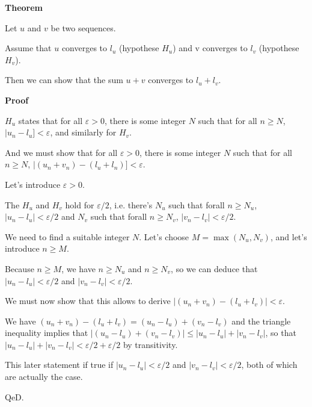 \documentclass{article}
\begin{document}
\textbf{Theorem}

Let $u$ and $v$ be two sequences.

Assume that $u$ converges to $l_u$ (hypothese $H_u$) and v converges to $l_v$ (hypothese $H_v$).

Then we can show that the sum $u+v$ converges to $l_u + l_v$.

\textbf{Proof}

$H_u$ states that for all $\varepsilon > 0$, there is some integer $N$ such that for all $n \geqslant N$, $|u_n - l_u] < \varepsilon$, and similarly for $H_v$.

And we must show that for all $\varepsilon > 0$, there is some integer $N$ such that for all $n \geqslant N$, $|(u_n + v_n) - (l_u+l_n)] < \varepsilon$.

Let's introduce $\varepsilon>0$.

The $H_u$ and $H_v$ hold for $\varepsilon/2$, i.e. there's $N_u$ such that forall $n \geqslant N_u$, $|u_n-l_u|<\varepsilon/2$ and  $N_v$ such that forall $n \geqslant N_v$, $|v_n-l_v|<\varepsilon/2$.

We need to find a suitable integer $N$. Let's choose $M=\max(N_u,N_v)$, and let's introduce $n\geqslant M$.

Because $n\geqslant M$, we have $n\geqslant N_u$ and $n\geqslant N_v$, so we can deduce that $|u_n-l_u|<\varepsilon/2$ and $|v_n-l_v|<\varepsilon/2$.

We must now show that this allows to derive $|(u_n+v_n)-(l_u+l_v)|<\varepsilon$.

We have $(u_n+v_n)-(l_u+l_v) = (u_n-l_u)+(v_n-l_v)$ and the triangle inequality implies that 
$|(u_n-l_u)+(v_n-l_v)| \leqslant |u_n-l_u|+|v_n-l_v|$, so that $|u_n-l_u|+|v_n-l_v|<\varepsilon/2+\varepsilon/2$ by transitivity.

This later statement if true if $|u_n-l_u|<\varepsilon/2$ and $|v_n-l_v|<\varepsilon/2$, both of which are actually the case.

QeD.
\end{document}
